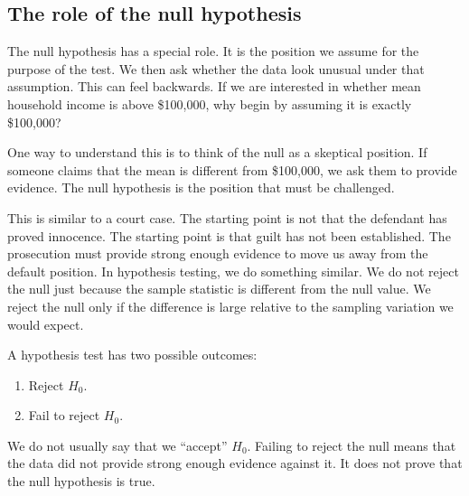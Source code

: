 \documentclass[
  letterpaper,
  DIV=11,
  numbers=noendperiod]{scrreprt}
\providecommand{\tightlist}{%
  \setlength{\itemsep}{0pt}\setlength{\parskip}{0pt}}
\begin{document}
\subsection{The role of the null
hypothesis}\label{the-role-of-the-null-hypothesis}

The null hypothesis has a special role. It is the position we assume for
the purpose of the test. We then ask whether the data look unusual under
that assumption. This can feel backwards. If we are interested in
whether mean household income is above \$100,000, why begin by assuming
it is exactly \$100,000?

One way to understand this is to think of the null as a skeptical
position. If someone claims that the mean is different from \$100,000,
we ask them to provide evidence. The null hypothesis is the position
that must be challenged.

This is similar to a court case. The starting point is not that the
defendant has proved innocence. The starting point is that guilt has not
been established. The prosecution must provide strong enough evidence to
move us away from the default position. In hypothesis testing, we do
something similar. We do not reject the null just because the sample
statistic is different from the null value. We reject the null only if
the difference is large relative to the sampling variation we would
expect.

\begin{tcolorbox}[enhanced jigsaw, arc=.35mm, bottomrule=.15mm, bottomtitle=1mm, breakable, colback=white, colbacktitle=quarto-callout-important-color!10!white, colframe=quarto-callout-important-color-frame, coltitle=black, left=2mm, leftrule=.75mm, opacityback=0, opacitybacktitle=0.6, rightrule=.15mm, title=\textcolor{quarto-callout-important-color}{\faExclamation}\hspace{0.5em}{Warning: We do not accept the null}, titlerule=0mm, toprule=.15mm, toptitle=1mm]

A hypothesis test has two possible outcomes:

\begin{enumerate}
\def\labelenumi{\arabic{enumi}.}
\tightlist
\item
  Reject \(H_0\).
\item
  Fail to reject \(H_0\).
\end{enumerate}

We do not usually say that we ``accept'' \(H_0\). Failing to reject the
null means that the data did not provide strong enough evidence against
it. It does not prove that the null hypothesis is true.

\end{tcolorbox}
\end{document}
